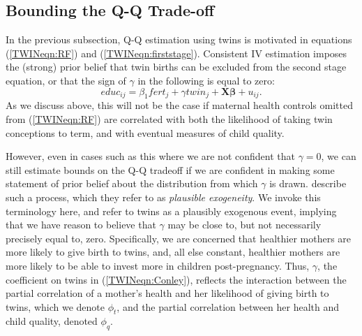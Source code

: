 \documentclass[subeqn]{article}
\begin{document}
\begin{spacing}{1.4}
\subsection{Bounding the Q-Q Trade-off}            \label{TWINsscn:methodBounds}
In the previous subsection, Q-Q estimation using twins is motivated in equations 
(\ref{TWINeqn:RF}) and (\ref{TWINeqn:firststage}).  Consistent IV estimation 
imposes the (strong) prior belief that twin births can be excluded from the 
second stage equation, or that the sign of $\gamma$ in the following is equal to 
zero:
\begin{equation}
\label{TWINeqn:Conley}
educ_{ij}=\beta_1 fert_j + \gamma twin_j + \bm{X}\bm{\beta} + u_{ij}.
\end{equation}
As we discuss above, this will not be the case if maternal health controls 
omitted from (\ref{TWINeqn:RF}) are correlated with both the likelihood of taking
twin conceptions to term, and with eventual measures of child quality.

However, even in cases such as this where we are not confident that $\gamma=0$,
we can still estimate bounds on the Q-Q tradeoff if we are confident in making
some statement of prior belief about the distribution from which $\gamma$ is 
drawn.  \citet{Conleyetal2012} describe such a process, which they refer to as 
\emph{plausible exogeneity}.  We invoke this terminology here, and refer to 
twins as a plausibly exogenous event, implying that we have reason to believe 
that $\gamma$ may be close to, but not necessarily precisely equal to, zero.
Specifically, we are concerned that healthier mothers are more likely to give
birth to twins, and, all else constant, healthier mothers are more likely to be 
able to invest more in children post-pregnancy.  Thus, $\gamma$, the coefficient 
on twins in (\ref{TWINeqn:Conley}), reflects the interaction between the partial 
correlation of a mother's health and her likelihood of giving birth to twins, 
which we denote $\phi_t$, and the partial correlation between her health and child 
quality, denoted $\phi_q$.


\end{spacing}
\end{document}
